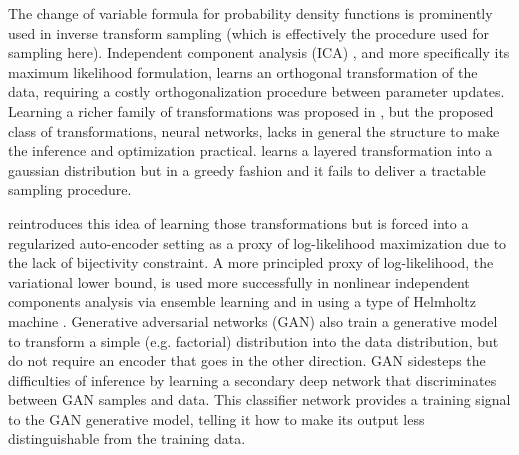 \documentclass{article}
\begin{document}

The change of variable formula for probability density functions is
prominently used in inverse transform sampling (which is effectively the
procedure used for sampling here). Independent component analysis (ICA)
\citep{hyvarinen2000independent}, and more specifically its maximum
likelihood formulation, learns an orthogonal transformation of the data,
requiring a costly orthogonalization procedure between parameter updates.
Learning a richer family of transformations was proposed in \citep{Bengio91},
but the proposed class of
transformations, neural networks, lacks in general the structure to make the inference
and optimization practical. \citep{chen2000gaussianization} learns a
layered transformation into a gaussian distribution but in a greedy fashion and it fails to deliver a tractable sampling procedure.

\citep{rippel2013high} reintroduces this idea of learning those transformations
but is forced into a regularized
auto-encoder setting as a proxy of log-likelihood maximization due to the lack of
bijectivity constraint. A more principled
proxy of log-likelihood, the variational lower bound, is used more successfully in
nonlinear independent components analysis \citep{hyvarinen1999nonlinear}
via ensemble learning \citep{roberts2001independent, lappalainen2000nonlinear} and in
\citep{Kingma+Welling-ICLR2014, Rezende-et-al-arxiv2014} using a type of Helmholtz machine \citep{Dayan95}.
Generative adversarial networks (GAN) \citep{Goodfellow-et-al-ARXIV2014} also
train a generative model to transform a simple 
(e.g. factorial) distribution into the data distribution, but do not require an encoder that
goes in the other direction. GAN sidesteps the difficulties of
inference by learning a secondary deep network that discriminates
between GAN samples and data.
This classifier network provides a training signal to the GAN generative model,
telling it how to make its output less distinguishable from the training data.
\end{document}
